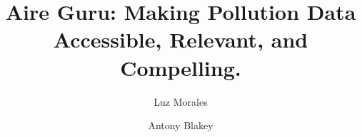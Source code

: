 \begin{frontmatter}

\title{Aire Guru: Making Pollution Data Accessible, Relevant, and Compelling.}

\author{Luz Morales}
\author{Antony Blakey}
\address{Illuminous\\ Johan van Hasseltweg 43-II, 1021 KN, Amsterdam}
\begin{comment}
    

\begin{abstract}
input{contents/frontmatter/abstract} 
\end{abstract}   


\begin{keyword}
Air Quality Index \sep Pollution \sep Monitoring \sep Visualization \sep Analysis \sep Big Data
\sep Accessible \sep Relevant \sep Compelling
\end{keyword}
\end{comment}
\end{frontmatter}